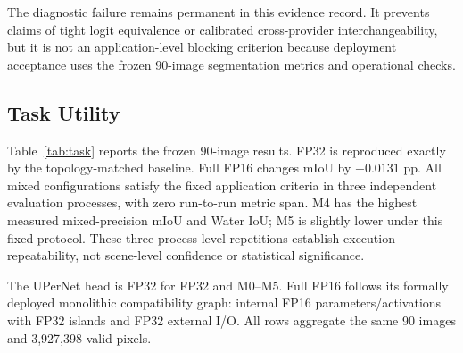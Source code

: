 \documentclass[conference]{IEEEtran}
\begin{document}
The diagnostic failure remains permanent in this evidence record. It prevents claims of tight logit equivalence or calibrated cross-provider interchangeability, but it is not an application-level blocking criterion because deployment acceptance uses the frozen 90-image segmentation metrics and operational checks.

\subsection{Task Utility}

Table~\ref{tab:task} reports the frozen 90-image results. FP32 is reproduced exactly by the topology-matched baseline. Full FP16 changes mIoU by $-0.0131$ pp. All mixed configurations satisfy the fixed application criteria in three independent evaluation processes, with zero run-to-run metric span. M4 has the highest measured mixed-precision mIoU and Water IoU; M5 is slightly lower under this fixed protocol. These three process-level repetitions establish execution repeatability, not scene-level confidence or statistical significance.

\begin{table}[t]
\caption{Task Metrics on the Fixed 90-Image Test Set}
\label{tab:task}
\centering
\small
{}
\parbox{0.98\textwidth}{\footnotesize The UPerNet head is FP32 for FP32 and M0--M5. Full FP16 follows its formally deployed monolithic compatibility graph: internal FP16 parameters/activations with FP32 islands and FP32 external I/O. All rows aggregate the same 90 images and 3,927,398 valid pixels.}
\end{table}
\end{document}
